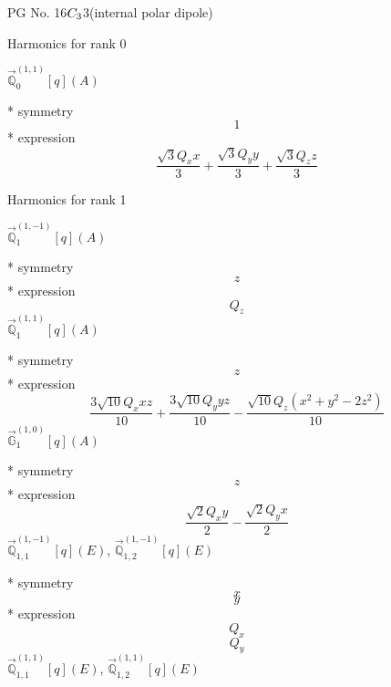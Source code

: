 \documentclass[fleqn,8pt]{jsarticle}
\begin{document}
\setcounter{MaxMatrixCols}{32}

\renewcommand{\tablename}{Table~}
\renewcommand{\figurename}{Figure~}
\begin{center}
\LARGE
PG No. 16\quad$C_{\rm 3}$\quad$3$\quad[ trigonal ] (internal polar dipole)
\end{center}

\noindent * Harmonics for rank 0

\noindent\quad $\vec{\mathbb{Q}}_{0}^{(1,1)}[q](A)$

\noindent\quad ** symmetry
\begin{dmath*}
1
\end{dmath*}
\noindent\quad ** expression
\begin{dmath*}
\frac{\sqrt{3} Q_{x} x}{3} + \frac{\sqrt{3} Q_{y} y}{3} + \frac{\sqrt{3} Q_{z} z}{3}
\end{dmath*}

\noindent * Harmonics for rank 1

\noindent\quad $\vec{\mathbb{Q}}_{1}^{(1,-1)}[q](A)$

\noindent\quad ** symmetry
\begin{dmath*}
z
\end{dmath*}
\noindent\quad ** expression
\begin{dmath*}
Q_{z}
\end{dmath*}
\noindent\quad $\vec{\mathbb{Q}}_{1}^{(1,1)}[q](A)$

\noindent\quad ** symmetry
\begin{dmath*}
z
\end{dmath*}
\noindent\quad ** expression
\begin{dmath*}
\frac{3 \sqrt{10} Q_{x} x z}{10} + \frac{3 \sqrt{10} Q_{y} y z}{10} - \frac{\sqrt{10} Q_{z} \left(x^{2} + y^{2} - 2 z^{2}\right)}{10}
\end{dmath*}
\noindent\quad $\vec{\mathbb{G}}_{1}^{(1,0)}[q](A)$

\noindent\quad ** symmetry
\begin{dmath*}
z
\end{dmath*}
\noindent\quad ** expression
\begin{dmath*}
\frac{\sqrt{2} Q_{x} y}{2} - \frac{\sqrt{2} Q_{y} x}{2}
\end{dmath*}
\noindent\quad $\vec{\mathbb{Q}}_{1,1}^{(1,-1)}[q](E)$, $\vec{\mathbb{Q}}_{1,2}^{(1,-1)}[q](E)$

\noindent\quad ** symmetry
\begin{dmath*}
x
\end{dmath*}
\begin{dmath*}
y
\end{dmath*}
\noindent\quad ** expression
\begin{dmath*}
Q_{x}
\end{dmath*}
\begin{dmath*}
Q_{y}
\end{dmath*}
\noindent\quad $\vec{\mathbb{Q}}_{1,1}^{(1,1)}[q](E)$, $\vec{\mathbb{Q}}_{1,2}^{(1,1)}[q](E)$
\end{document}
